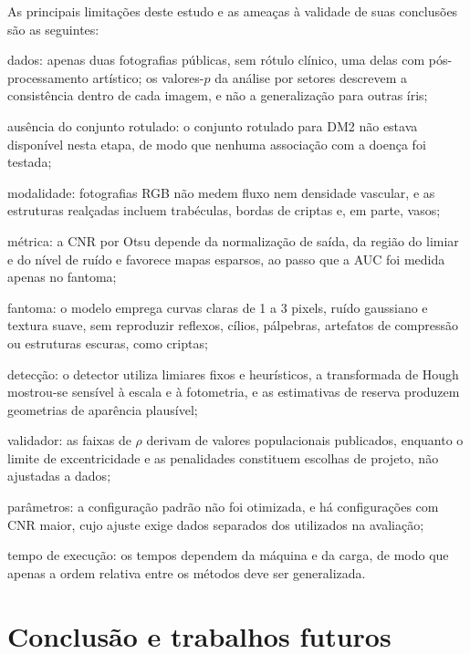 \documentclass[12pt, oneside, a4paper, chapter=TITLE, section=TITLE,
               english, brazil]{abntex2}
\begin{document}
As principais limitações deste estudo e as ameaças à validade de suas
conclusões são as seguintes:
\begin{alineas}
  \item dados: apenas duas fotografias públicas, sem rótulo clínico, uma
  delas com pós-processamento artístico; os valores-$p$ da análise por
  setores descrevem a consistência dentro de cada imagem, e não a
  generalização para outras íris;
  \item ausência do conjunto rotulado: o conjunto rotulado para DM2 não
  estava disponível nesta etapa, de modo que nenhuma associação com a doença
  foi testada;
  \item modalidade: fotografias RGB não medem fluxo nem densidade vascular,
  e as estruturas realçadas incluem trabéculas, bordas de criptas e, em
  parte, vasos;
  \item métrica: a CNR por Otsu depende da normalização de saída, da região
  do limiar e do nível de ruído e favorece mapas esparsos, ao passo que a AUC
  foi medida apenas no fantoma;
  \item fantoma: o modelo emprega curvas claras de 1 a 3 pixels, ruído
  gaussiano e textura suave, sem reproduzir reflexos, cílios, pálpebras,
  artefatos de compressão ou estruturas escuras, como criptas;
  \item detecção: o detector utiliza limiares fixos e heurísticos, a
  transformada de Hough mostrou-se sensível à escala e à fotometria, e as
  estimativas de reserva produzem geometrias de aparência plausível;
  \item validador: as faixas de $\rho$ derivam de valores populacionais
  publicados, enquanto o limite de excentricidade e as penalidades constituem
  escolhas de projeto, não ajustadas a dados;
  \item parâmetros: a configuração padrão não foi otimizada, e há
  configurações com CNR maior, cujo ajuste exige dados separados dos
  utilizados na avaliação;
  \item tempo de execução: os tempos dependem da máquina e da carga, de modo
  que apenas a ordem relativa entre os métodos deve ser generalizada.
\end{alineas}

\chapter{Conclusão e trabalhos futuros}
\label{cap:conclusao}
\end{document}

